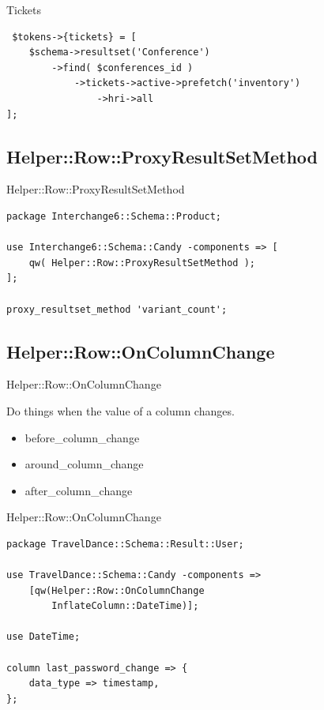 \begin{frame}[fragile]{Tickets}
\begin{lstlisting}
 $tokens->{tickets} = [
    $schema->resultset('Conference')
        ->find( $conferences_id )
            ->tickets->active->prefetch('inventory')
                ->hri->all 
];
\end{lstlisting}
\end{frame}

\subsection{Helper::Row::ProxyResultSetMethod}

\begin{frame}[fragile]{Helper::Row::ProxyResultSetMethod}
\begin{lstlisting}
package Interchange6::Schema::Product;

use Interchange6::Schema::Candy -components => [
    qw( Helper::Row::ProxyResultSetMethod );
];

proxy_resultset_method 'variant_count';
\end{lstlisting}
\end{frame}

\subsection{Helper::Row::OnColumnChange}

\begin{frame}[fragile]{Helper::Row::OnColumnChange}

Do things when the value of a column changes.

\begin{itemize}
\item before\_column\_change
\item around\_column\_change
\item after\_column\_change
\end{itemize}

\end{frame}

\begin{frame}[fragile]{Helper::Row::OnColumnChange}

\begin{lstlisting}
package TravelDance::Schema::Result::User;

use TravelDance::Schema::Candy -components =>
    [qw(Helper::Row::OnColumnChange 
        InflateColumn::DateTime)];

use DateTime;

column last_password_change => {
    data_type => timestamp,
};
\end{lstlisting}
\end{frame}

